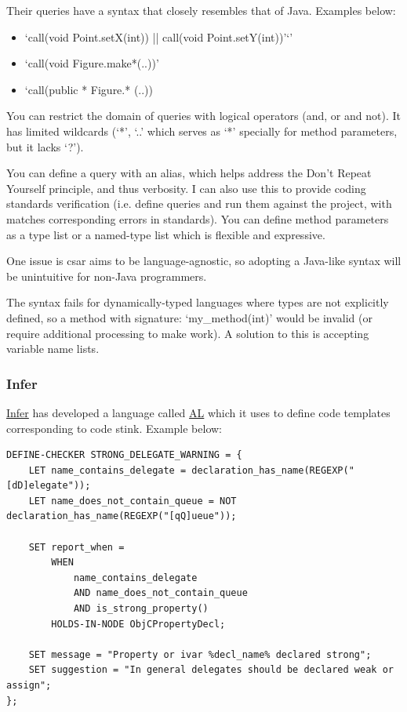 \documentclass[12pt, letterpaper]{article}
\begin{document}
Their queries have a syntax that closely resembles that of Java. Examples below:
\begin{itemize}
    \item `call(void Point.setX(int)) || call(void Point.setY(int))'`'
    \item `call(void Figure.make*(..))'
    \item `call(public * Figure.* (..))
\end{itemize}

You can restrict the domain of queries with logical operators (and, or and not).
It has limited wildcards (`*', `..' which serves as `*' specially for method parameters, but it lacks `?').

You can define a query with an alias, which helps address the Don't Repeat Yourself principle, and thus verbosity.
I can also use this to provide coding standards verification (i.e. define queries and run them against the project, with matches corresponding errors in standards).
You can define method parameters as a type list or a named-type list which is flexible and expressive.

One issue is csar aims to be language-agnostic, so adopting a Java-like syntax will be unintuitive for non-Java programmers.

The syntax fails for dynamically-typed languages where types are not explicitly defined, so a method with signature: `my\_method(int)' would be invalid (or require additional processing to make work).
A solution to this is accepting variable name lists.

\subsubsection{Infer}
\href{https://github.com/facebook/infer}{Infer} has developed a language called \href{https://code.facebook.com/posts/277643589367408/}{AL} which it uses to define code templates corresponding to code stink. Example below:  

\begin{lstlisting}
DEFINE-CHECKER STRONG_DELEGATE_WARNING = {
    LET name_contains_delegate = declaration_has_name(REGEXP("[dD]elegate"));
    LET name_does_not_contain_queue = NOT declaration_has_name(REGEXP("[qQ]ueue"));

    SET report_when =
        WHEN
            name_contains_delegate
            AND name_does_not_contain_queue
            AND is_strong_property()
        HOLDS-IN-NODE ObjCPropertyDecl;

    SET message = "Property or ivar %decl_name% declared strong";
    SET suggestion = "In general delegates should be declared weak or assign";
};
\end{lstlisting}
\end{document}

